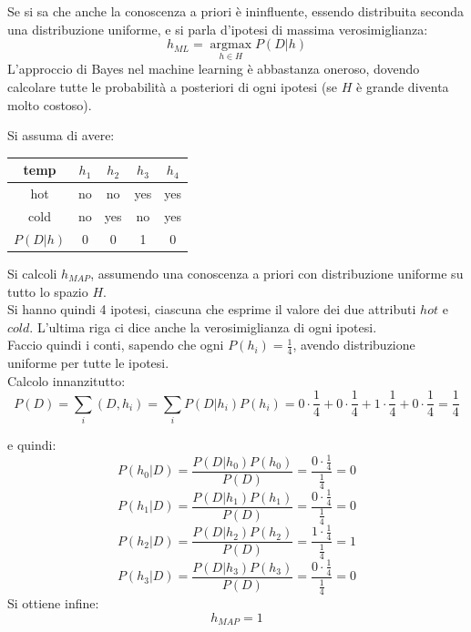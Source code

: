 Se si sa che anche la conoscenza a priori è ininfluente, essendo distribuita
seconda una distribuzione uniforme, e si parla d'ipotesi di massima
verosimiglianza:
\[h_{ML}=\operatorname*{argmax}_{h\in H}P(D|h)\]
L'approccio di Bayes nel machine learning è abbastanza oneroso, dovendo
calcolare tutte le probabilità a posteriori di ogni ipotesi (se $H$ è grande
diventa molto costoso).
\begin{esercizio}
  Si assuma di avere:
  \begin{table}[H]
    \centering
    \begin{tabular}{c||c|c|c|c}
      temp & $h_1$ & $h_2$ & $h_3$ & $h_4$\\
      \hline
      \hline
      hot & no & no & yes & yes\\
      cold & no &yes & no & yes \\
      \hline
      \hline
      $P(D|h)$ & 0 & 0 & 1 &0
    \end{tabular}
  \end{table}
  Si calcoli $h_{MAP}$, assumendo una conoscenza a priori con distribuzione
  uniforme su tutto lo spazio $H$.\\
  Si hanno quindi 4 ipotesi, ciascuna che esprime il valore dei due attributi
  $hot $ e $cold$. L'ultima riga ci dice anche la verosimiglianza di ogni
  ipotesi.\\
  Faccio quindi i conti, sapendo che ogni $P(h_i)=\frac{1}{4}$, avendo
  distribuzione uniforme per tutte le ipotesi.\\
  Calcolo innanzitutto:
  \[P(D)=\sum_i(D, h_i)=\sum_i
    P(D|h_i)P(h_i)=0\cdot\frac{1}{4}+0\cdot\frac{1}{4}+
    1\cdot\frac{1}{4}+0\cdot\frac{1}{4}=\frac{1}{4}\]
  
  e quindi:
  \[P(h_0|D)=\frac{P(D|h_0)P(h_0)}{P(D)}=
    \frac{0\cdot\frac{1}{4}}{\frac{1}{4}}=0\]
  \[P(h_1|D)=\frac{P(D|h_1)P(h_1)}{P(D)}=
    \frac{0\cdot\frac{1}{4}}{\frac{1}{4}}=0\]
  \[P(h_2|D)=\frac{P(D|h_2)P(h_2)}{P(D)}=
    \frac{1\cdot\frac{1}{4}}{\frac{1}{4}}=1\]
  \[P(h_3|D)=\frac{P(D|h_3)P(h_3)}{P(D)}=
    \frac{0\cdot\frac{1}{4}}{\frac{1}{4}}=0\]
  Si ottiene infine:
  \[h_{MAP}=1\]
\end{esercizio}
